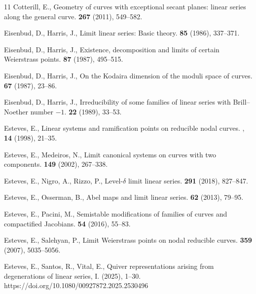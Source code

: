 \documentclass[a4paper,11pt]{amsart}
\theoremstyle{plain}
\theoremstyle{definition}
\theoremstyle{remark}
\begin{document}
\begin{thebibliography}{11}
Cotterill, E.,
\newblock Geometry of curves with exceptional secant planes: linear series along the general curve.
 \textbf{267} (2011), 549--582.

Eisenbud, D., Harris, J.,
\newblock Limit linear series: Basic theory.
 \textbf{85} (1986), 337--371.

Eisenbud, D., Harris, J.,
\newblock Existence, decomposition and limits of certain Weierstrass points.
 \textbf{87} (1987), 495--515.

Eisenbud, D., Harris, J.,
\newblock On the Kodaira dimension of the moduli space of curves.
 \textbf{67} (1987), 23--86.

Eisenbud, D., Harris, J.,
\newblock Irreducibility of some families of linear series with Brill--Noether number $-1$.
 \textbf{22} (1989), 33--53.

Esteves, E.,
\newblock Linear systems and ramification points on reducible nodal curves.
, \textbf{14} (1998), 21--35.

Esteves, E., Medeiros, N.,
\newblock Limit canonical systems on curves with two components.
 \textbf{149} (2002), 267--338.

Esteves, E., Nigro, A., Rizzo, P.,
\newblock Level-$\delta$ limit linear series.
 \textbf{291} (2018), 827--847.

Esteves, E., Osserman, B.,
\newblock Abel maps and limit linear series.
 \textbf{62} (2013), 79--95.

Esteves, E., Pacini, M.,
\newblock Semistable modifications of families of curves and compactified Jacobians.
 \textbf{54} (2016), 55--83.

Esteves, E., Salehyan, P.,
\newblock Limit Weierstrass points on nodal reducible curves.
 \textbf{359} (2007), 5035--5056.

Esteves, E., Santos, R., Vital, E., 
\newblock Quiver representations arising from degenerations of linear series, I. 
 (2025), 1–30. https://doi.org/10.1080/00927872.2025.2530496


\end{thebibliography}
\end{document}
